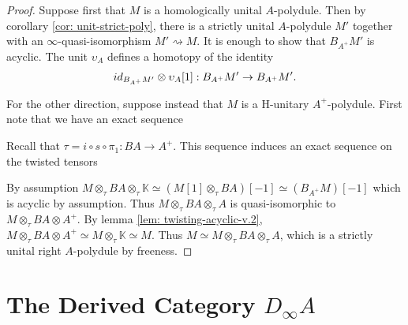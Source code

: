 \documentclass[../thesis.tex]{subfiles}
\begin{document}
            \begin{proof}
                Suppose first that $M$ is a homologically unital $A$-polydule. Then by corollary \ref{cor: unit-strict-poly}, there is a strictly unital $A$-polydule $M'$ together with an $\infty$-quasi-isomorphism $M' \rightsquigarrow M$. It is enough to show that $B_{A^+}M'$ is acyclic. The unit $\upsilon_{A}$ defines a homotopy of the identity
                \begin{align*}
                    id_{B_{A^+}M'}\otimes \upsilon_{A}[1] : B_{A^+}M' \rightarrow B_{A^+}M'\tt{.}
                \end{align*}

                For the other direction, suppose instead that $M$ is a H-unitary $A^+$-polydule. First note that we have an exact sequence
                \begin{center}
                \end{center}
                Recall that $\tau = i\circ s \circ \pi_1 : BA \rightarrow A^+$. This sequence induces an exact sequence on the twisted tensors
                \begin{center}
                \end{center}
                By assumption $M \otimes_\tau BA \otimes_\tau \mathbb{K} \simeq (M[1] \otimes_\tau BA)[-1] \simeq (B_{A^+}M)[-1]$ which is acyclic by assumption. Thus $M \otimes_\tau BA \otimes_\tau A$ is quasi-isomorphic to $M \otimes_\tau BA \otimes A^+$. By lemma \ref{lem: twisting-acyclic-v.2}, $M \otimes_\tau BA \otimes A^+ \simeq M \otimes _\tau \mathbb{K} \simeq M$. Thus $M \simeq M\otimes_\tau BA \otimes_\tau A$, which is a strictly unital right $A$-polydule by freeness. 
            \end{proof}

    \section{The Derived Category $D_\infty A$}
\end{document}
